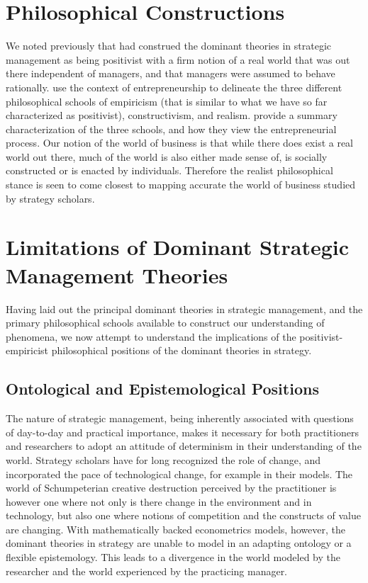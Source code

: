 \documentclass[12pt,letterpaper]{article}
\begin{document}
\section{Philosophical Constructions}
We noted previously that \cite{Teece1997b} had construed the dominant theories in strategic management as being positivist with a firm notion of a real world that was out there independent of managers, and that managers were assumed to behave rationally. \cite{Ramoglou2016} use the context of entrepreneurship to delineate the three different philosophical schools of empiricism (that is similar to what we have so far characterized as positivist), constructivism, and realism.\cite{Ramoglou2016} provide a summary characterization of the three schools, and how they view the entrepreneurial process. Our notion of the world of business is that  while there does exist a real world out there, much of the world is also either made sense of, is socially constructed or is enacted by individuals. Therefore the realist philosophical stance is seen to come closest to mapping accurate the world of business studied by strategy scholars.


\section{Limitations of Dominant Strategic Management Theories}\label{S:LimitationsDominantTheories}
Having laid out the principal dominant theories in strategic management, and the primary philosophical schools available to construct our understanding of phenomena, we now attempt to understand the implications of the positivist-empiricist philosophical positions of the dominant theories in strategy.

\subsection{Ontological and Epistemological Positions}
The nature of strategic management, being inherently associated with questions of day-to-day and practical importance, makes it necessary for both practitioners and researchers to adopt an attitude of determinism in their understanding of the world. Strategy scholars have for long recognized the role of change, and incorporated the pace of technological change, for example in their models. The world of Schumpeterian creative destruction perceived by the practitioner is however one where not only is there change in the environment and in technology, but also one where notions of competition and the constructs of value are changing. With mathematically backed  econometrics models, however, the dominant theories in strategy are unable to model in an adapting ontology or a flexible epistemology. This leads to a divergence in the world modeled by the researcher and the world experienced by the practicing manager.
\end{document}
